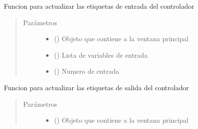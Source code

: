 \documentclass[letterpaper,10pt,spanish]{sphinxmanual}
\begin{document}
\begin{fulllineitems}
\begin{fulllineitems}
\label{\detokenize{codigos/rutinas_fuzzy:rutinas_fuzzy.FuzzyController.cambio_etiquetas_input}}
Funcion para actualizar las etiquetas de entrada del controlador
\begin{quote}\begin{description}
\item[{Parámetros}] \leavevmode\begin{itemize}
\item {} 
 () \textendash{} Objeto que contiene a la ventana principal

\item {} 
 () \textendash{} Lista de variables de entrada

\item {} 
 () \textendash{} Numero de entrada

\end{itemize}

\end{description}\end{quote}

\end{fulllineitems}


\begin{fulllineitems}
\label{\detokenize{codigos/rutinas_fuzzy:rutinas_fuzzy.FuzzyController.cambio_etiquetas_output}}
Funcion para actualizar las etiquetas de salida del controlador
\begin{quote}\begin{description}
\item[{Parámetros}] \leavevmode\begin{itemize}
\item {} 
 () \textendash{} Objeto que contiene a la ventana principal


\end{itemize}
\end{description}
\end{quote}
\end{fulllineitems}
\end{fulllineitems}
\end{document}
